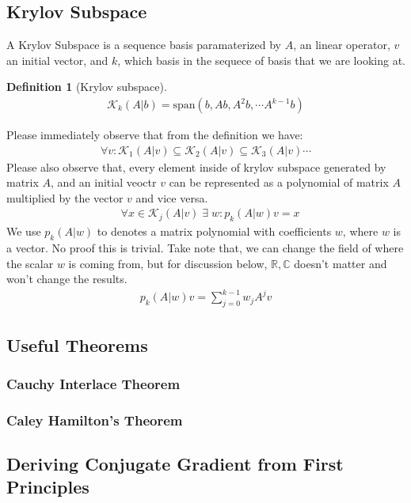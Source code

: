 \documentclass[]{article}
\theoremstyle{definition}
\newtheorem{definition}{Definition}
\begin{document}
    \subsection{Krylov Subspace}
        A Krylov Subspace is a sequence basis paramaterized by $A$, an linear operator, $v$ an initial vector, and $k$, which basis in the sequece of basis that we are looking at. 
        \begin{definition}[Krylov subspace]
            \begin{align}
                \mathcal{K}_k(A|b) = \text{span}( b, Ab, A^2b, \cdots A^{k - 1}b)
            \end{align}
        \end{definition}
        Please immediately observe that from the definition we have: 
        \begin{align}
            \forall v: \mathcal{K}_1(A|v)  \subseteq  \mathcal{K}_2(A|v)  \subseteq \mathcal{K}_3(A|v)  \cdots 
        \end{align}
        Please also observe that, every element inside of krylov subspace generated by matrix $A$, and an initial veoctr $v$ can be represented as a polynomial of matrix $A$ multiplied by the vector $v$ and vice versa.
        \begin{align}
            & \forall x \in \mathcal K_j(A|v) \;\exists\; w: p_k(A|w)v = x
        \end{align}
        We use $p_k(A|w)$ to denotes a matrix polynomial with coefficients $w$, where $w$ is a vector. No proof this is trivial. Take note that, we can change the field of where the scalar $w$ is coming from, but for discussion below, $\mathbb R, \mathbb C$  doesn't matter and won't change the results. 
        \begin{align}
            p_k(A|w)v = \sum_{j = 0}^{k - 1}w_jA^jv
        \end{align}
    \subsection{Useful Theorems}
        \subsubsection{Cauchy Interlace Theorem}
        \subsubsection{Caley Hamilton's Theorem}
    \subsection{Deriving Conjugate Gradient from First Principles}
\end{document}
